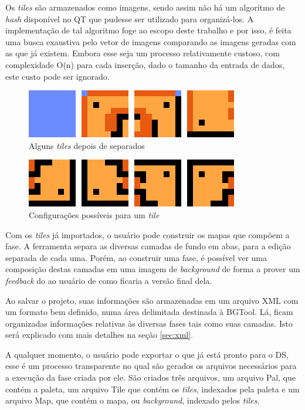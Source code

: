 \documentclass[brazil]{abnt}
\begin{document}
Os \textit{tiles} são armazenados como imagens, sendo assim não há um algoritmo de \textit{hash} disponível no QT que pudesse ser utilizado para organizá-los. A implementação de tal algoritmo foge ao escopo deste trabalho e por isso, é feita uma busca exaustiva pelo vetor de imagens comparando as imagens geradas com as que já existem. Embora esse seja um processo relativamente custoso, com complexidade O(n) para cada inserção, dado o tamanho da entrada de dados, este custo pode ser ignorado.

\begin{figure}[h!]
\centering
\includegraphics[scale=1]{imgs/tiles1.png}
\caption{Alguns \textit{tiles} depois de separados}
\end{figure}

\begin{figure}[h!]
\centering
\includegraphics[scale=1]{imgs/tiles2.png}
\caption{Configurações possíveis para um \textit{tile}}
\end{figure}

Com os \textit{tiles} já importados, o usuário pode construir os mapas que compõem a fase. A ferramenta separa as diversas camadas de fundo em abas, para a edição separada de cada uma. Porém, ao construir uma fase, é possível ver uma composição destas camadas em uma imagem de \textit{background} de forma a prover um \textit{feedback} do ao usuário de como ficaria a versão final dela.

Ao salvar o projeto, suas informações são armazenadas em um arquivo XML com um formato bem definido, numa área delimitada destinada à BGTool. Lá, ficam organizadas informações relativas às diversas fases tais como suas camadas. Isto será explicado com mais detalhes na seção \ref{sec:xml}.

A qualquer momento, o usuário pode exportar o que já está pronto para o DS, esse é um processo transparente no qual são gerados os arquivos necessários para a execução da fase criada por ele. São criados três arquivos, um arquivo Pal, que contém a paleta, um arquivo Tile que contém os \textit{tiles}, indexados pela paleta e um arquivo Map, que contém o mapa, ou \textit{background}, indexado pelos \textit{tiles}.
\end{document}

